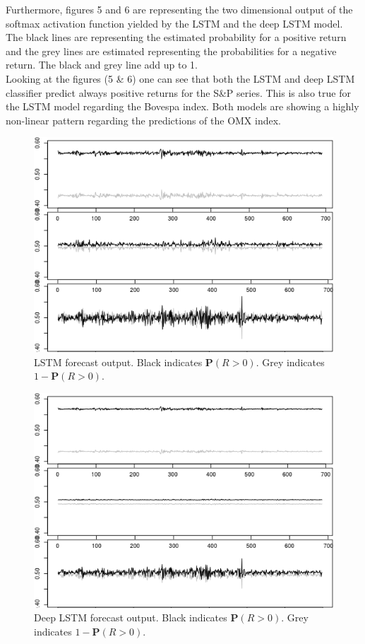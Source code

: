 \documentclass[12pt, letterpaper]{amsart}%
\begin{document}
Furthermore, figures 5 and 6 are representing the two dimensional output of the softmax activation function yielded by the LSTM and the deep LSTM model. The black lines are representing the estimated probability for a positive return and the grey lines are estimated representing the probabilities for a negative return. The black and grey line add up to 1.
\\

Looking at the figures (5 \& 6) one can see that both the LSTM and deep LSTM classifier predict always positive returns for the S\&P series. This is also true for the LSTM model regarding the Bovespa index. Both models are showing a highly non-linear pattern regarding the predictions of the OMX index.

\begin{figure}[H]
\caption{LSTM forecast output. Black indicates $\mathbf{P}(R>0)$. Grey indicates $1 - \mathbf{P}(R>0)$.}
\centering
\includegraphics[scale=0.5]{lstm_prob.png}
\end{figure}

\begin{figure}[H]
\caption{Deep LSTM forecast output. Black indicates $\mathbf{P}(R>0)$. Grey indicates $1 - \mathbf{P}(R>0)$.}
\centering
\includegraphics[scale=0.5]{lstm_deep_prob.png}
\end{figure}
\end{document}
